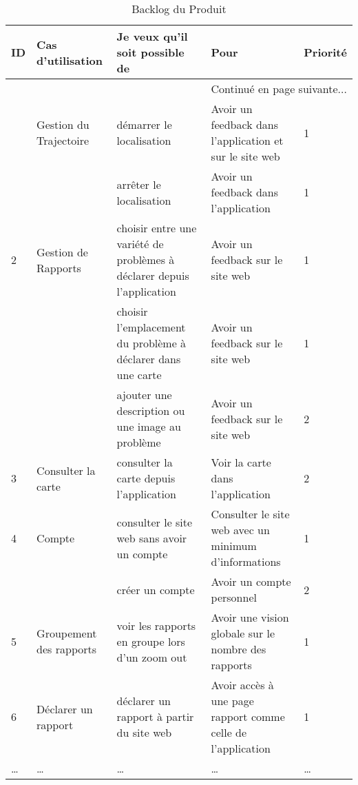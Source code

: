 \begin{center}
    \footnotesize
    \setlength\LTleft{-20pt}
    \begin{longtable}{| l | p{3.5cm} | p{5.5cm} | p{5cm} | l |}
 \caption{Backlog du Produit}
 \label{tab:product-backlog} \\

 \hline
 \textbf{ID} & \textbf{Cas d'utilisation} & \textbf{Je veux qu'il soit possible de} & \textbf{Pour} & \textbf{Priorité} \\ \hline
 \endhead

 \hline \multicolumn{5}{|r|}{{Continué en page suivante$\dotsc$}} \\ \hline
 \endfoot

 \hline \hline
 \endlastfoot

\hline
1 & Gestion du Trajectoire & démarrer le localisation & Avoir un feedback dans l'application et sur le site web & 1 \\ \cline{3-5}
  &                        & arrêter le localisation & Avoir un feedback dans l'application & 1 \\ \hline
2 & Gestion de Rapports    & choisir entre une variété de problèmes à déclarer depuis l'application & Avoir un feedback sur le site web & 1 \\ \cline{3-5}
  &                        & choisir l'emplacement du problème à déclarer dans une carte & Avoir un feedback sur le site web & 1 \\ \cline{3-5}
  &                        & ajouter une description ou une image au problème & Avoir un feedback sur le site web & 2 \\ \hline
3 & Consulter la carte     & consulter la carte depuis l'application & Voir la carte dans l'application & 2 \\ \hline
4 & Compte                 & consulter le site web sans avoir un compte & Consulter le site web avec un minimum d'informations & 1 \\ \cline{3-5}
  &                        & créer un compte & Avoir un compte personnel & 2 \\ \hline
5 & Groupement des rapports& voir les rapports en groupe lors d'un zoom out & Avoir une vision globale sur le nombre des rapports & 1 \\ \hline
6 & Déclarer un rapport    & déclarer un rapport à partir du site web & Avoir accès à une page rapport comme celle de l'application & 1 \\ \hline
 \hline \ldots & \ldots & \ldots & \ldots & \ldots \\ \hline


\end{longtable}
\end{center}
